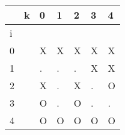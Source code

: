 \documentclass{article}
\begin{document}
    \begin{center}

    \large
        \begin{tabular}{| m{.35cm} | m{.35cm} | m{.35cm} | m{.35cm} | m{.35cm} | m{.35cm} | m{.35cm} |}

            \hline
            & k & 0 & 1 & 2 & 3 & 4 \\
            \hline
            i & &  &  &  &  &  \\
            \hline
            0 & & X & X & X & X & X \\
            \hline
            1 & & . & . & . & X & X \\
            \hline
            2 & & X & . & X & . & O \\
            \hline
            3 & & O & . & O & . & . \\
            \hline
            4 & & O & O & O & O & O \\
            \hline
        
    \end{tabular}
    \end{center}
\end{document}
